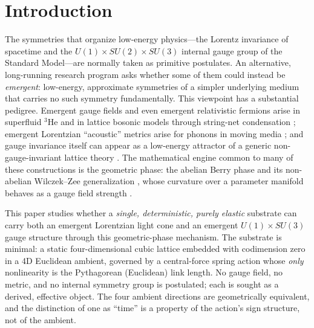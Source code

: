 \section{Introduction}
\label{sec:intro}

The symmetries that organize low-energy physics---the Lorentz invariance of spacetime
and the $U(1)\times SU(2)\times SU(3)$ internal gauge group of the Standard Model---are
normally taken as primitive postulates. An alternative, long-running research program
asks whether some of them could instead be \emph{emergent}: low-energy, approximate
symmetries of a simpler underlying medium that carries no such symmetry fundamentally.
This viewpoint has a substantial pedigree. Emergent gauge fields and even emergent
relativistic fermions arise in superfluid ${}^3$He \citep{Volovik2003} and in
lattice bosonic models through string-net condensation \citep{Wen2004,LevinWen2005};
emergent Lorentzian ``acoustic'' metrics arise for phonons in moving media
\citep{Unruh1981,BarceloLiberatiVisser2005}; and gauge invariance itself can appear as
a low-energy attractor of a generic non-gauge-invariant lattice theory
\citep{ForsterNielsenNinomiya1980}. The mathematical engine common to many of these
constructions is the geometric phase: the abelian Berry phase
\citep{Berry1984,Simon1983} and its non-abelian Wilczek--Zee generalization
\citep{WilczekZee1984,ShapereWilczek1989}, whose curvature over a parameter manifold
behaves as a gauge field strength \citep{XiaoChangNiu2010}.

This paper studies whether a \emph{single, deterministic, purely elastic} substrate can
carry both an emergent Lorentzian light cone and an emergent $U(1)\times SU(3)$ gauge
structure through this geometric-phase mechanism. The substrate is minimal: a static
four-dimensional cubic lattice embedded with codimension zero in a 4D Euclidean ambient,
governed by a central-force spring action whose \emph{only} nonlinearity is the
Pythagorean (Euclidean) link length. No gauge field, no metric, and no internal symmetry
group is postulated; each is sought as a derived, effective object. The four ambient
directions are geometrically equivalent, and the distinction of one as ``time'' is a
property of the action's sign structure, not of the ambient.

